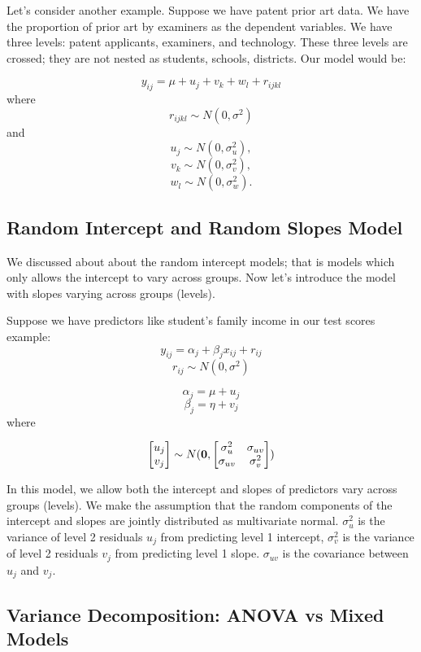 Let's consider another example.  Suppose we have patent prior art data.  We have the proportion of prior art by examiners as the dependent variables.  We have three levels:  patent applicants, examiners, and technology.  These three levels are crossed; they are not nested as students, schools, districts.  Our model would be:

\[ y_{ij}=\mu + u_j + v_k + w_l  +  r_{ijkl} \]
where \[ r_{ijkl} \sim  N(0, \sigma^2)\] 
and
  \[ u_{j} \sim  N(0, \sigma_{u}^2),\]
  \[ v_{k} \sim  N(0, \sigma_{v}^2),\]
  \[ w_{l} \sim  N(0, \sigma_{w}^2).\]


\subsection{Random Intercept and Random Slopes  Model}

We discussed about about the random intercept models; that is models which only allows the intercept to vary across groups.  Now let's introduce the model with slopes varying across groups (levels).

Suppose we have predictors like student's family income in our test scores example:
\[ y_{ij}=\alpha_j + \beta_j x_{ij} +  r_{ij} \]
 \[ r_{ij} \sim  N(0, \sigma^2)\]

\[\alpha_j= \mu + u_j\]
\[\beta_j= \eta + v_j\]
where

\begin{equation*}
\begin{bmatrix}
u_j \\ v_j
\end{bmatrix}
 \sim N({\bf 0},
\begin{bmatrix} \sigma_u^2 & \sigma_{uv}  \\ \sigma_{uv}  & \sigma_v^2
\end{bmatrix})
\end{equation*}

In this model, we allow both the intercept and slopes of predictors vary across groups (levels).  We make the assumption that the random components of the intercept and slopes are jointly distributed as multivariate normal.  $\sigma_u^2$ is the variance of level 2 residuals $u_j$ from predicting level 1 intercept,  $\sigma_v^2$ is the variance of level 2 residuals $v_j$ from predicting level 1 slope.  $\sigma_{uv}$ is the covariance between $u_j$ and $v_j$.

\subsection{Variance Decomposition:  ANOVA vs Mixed Models }

